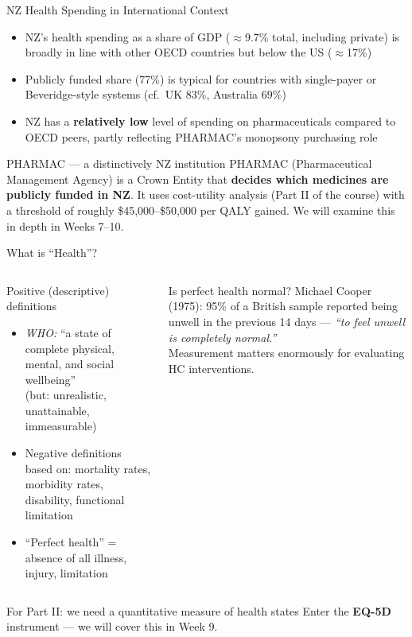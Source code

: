 \documentclass[aspectratio=169, 12pt]{beamer}
\begin{document}
\begin{frame}{NZ Health Spending in International Context}
  \begin{itemize}
    \item NZ's health spending as a share of GDP ($\approx$9.7\% total, including private) is
          broadly in line with other OECD countries but below the US ($\approx$17\%)
    \item Publicly funded share (77\%) is typical for countries with single-payer or
          Beveridge-style systems (cf.\ UK 83\%, Australia 69\%)
    \item NZ has a \textbf{relatively low} level of spending on pharmaceuticals compared
          to OECD peers, partly reflecting PHARMAC's monopsony purchasing role
  \end{itemize}
  \begin{exampleblock}{PHARMAC --- a distinctively NZ institution}
    PHARMAC (Pharmaceutical Management Agency) is a Crown Entity that \textbf{decides which
    medicines are publicly funded in NZ}. It uses cost-utility analysis (Part II of the course)
    with a threshold of roughly \$45,000--\$50,000 per QALY gained. We will examine this in
    depth in Weeks 7--10.
  \end{exampleblock}
\end{frame}

\begin{frame}{What is ``Health''?}
  \begin{columns}
      \begin{block}{Positive (descriptive) definitions}
        \begin{itemize}
          \item \textit{WHO:} ``a state of complete physical, mental, and social wellbeing''\\
                {\footnotesize (but: unrealistic, unattainable, immeasurable)}
          \item Negative definitions based on: mortality rates, morbidity rates, disability,
                functional limitation
          \item ``Perfect health'' = absence of all illness, injury, limitation
        \end{itemize}
      \end{block}
      \begin{alertblock}{Is perfect health normal?}
        Michael Cooper (1975): 95\% of a British sample reported being unwell in the
        previous 14 days --- \emph{``to feel unwell is completely normal.''}\\[0.3em]
        Measurement matters enormously for evaluating HC interventions.
      \end{alertblock}
  \end{columns}
  \vspace{0.4em}
  \begin{block}{For Part II: we need a quantitative measure of health states}
    Enter the \textbf{EQ-5D} instrument --- we will cover this in Week 9.
  \end{block}
\end{frame}
\end{document}
